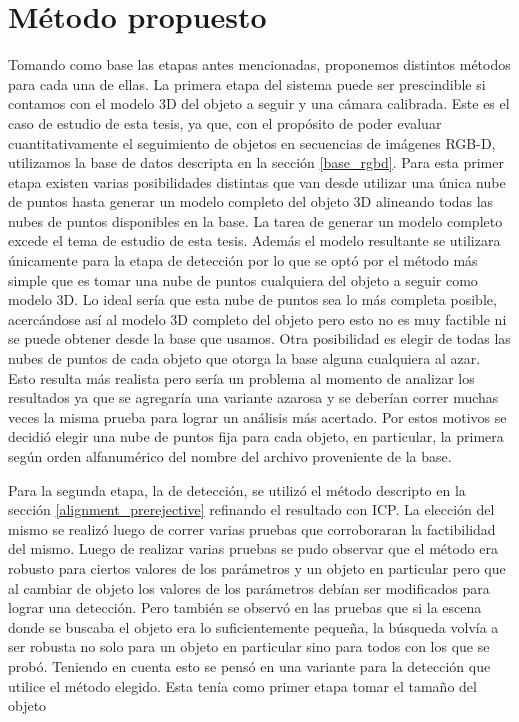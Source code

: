\section{Método propuesto}\label{metodo_propuesto}
Tomando como base las etapas antes mencionadas, proponemos distintos métodos para cada una de ellas. La primera etapa del sistema puede ser prescindible si contamos con el modelo 3D del objeto a seguir y una cámara calibrada. Este es el caso de estudio de esta tesis, ya que, con el propósito de poder evaluar cuantitativamente el seguimiento de objetos en secuencias de imágenes RGB-D, utilizamos la base de datos descripta en la sección \ref{base_rgbd}.
Para esta primer etapa existen varias posibilidades distintas que van desde utilizar una única nube de puntos hasta generar un modelo completo del objeto 3D alineando todas las nubes de puntos disponibles en la base. La tarea de generar un modelo completo excede el tema de estudio de esta tesis. Además el modelo resultante se utilizara únicamente para la etapa de detección por lo que se optó por el método más simple que es tomar una nube de puntos cualquiera del objeto a seguir como modelo 3D. Lo ideal sería que esta nube de puntos sea lo más completa posible, acercándose así al modelo 3D completo del objeto pero esto no es muy factible ni se puede obtener desde la base que usamos. Otra posibilidad es elegir de todas las nubes de puntos de cada objeto que otorga la base alguna cualquiera al azar. Esto resulta más realista pero sería un problema al momento de analizar los resultados ya que se agregaría una variante azarosa y se deberían correr muchas veces la misma prueba para lograr un análisis más acertado. Por estos motivos se decidió elegir una nube de puntos fija para cada objeto, en particular, la primera según orden alfanumérico del nombre del archivo proveniente de la base.

Para la segunda etapa, la de detección, se utilizó el método descripto en la sección \ref{alignment_prerejective} refinando el resultado con ICP. La elección del mismo se realizó luego de correr varias pruebas que corroboraran la factibilidad del mismo. Luego de realizar varias pruebas se pudo observar que el método era robusto para ciertos valores de los parámetros y un objeto en particular pero que al cambiar de objeto los valores de los parámetros debían ser modificados para lograr una detección. Pero también se observó en las pruebas que si la escena donde se buscaba el objeto era lo suficientemente pequeña, la búsqueda volvía a ser robusta no solo para un objeto en particular sino para todos con los que se probó. Teniendo en cuenta esto se pensó en una variante para la detección que utilice el método elegido. Esta tenía como primer etapa tomar el tamaño del objeto




